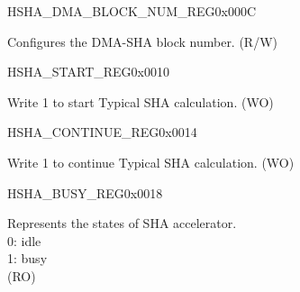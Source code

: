 \begin{register}{H}{SHA\_DMA\_BLOCK\_NUM\_REG}{0x000C}\label{regdesc:SHADMABLOCKNUMREG}
%
%
\regnewline%
\begin{regdesc}\begin{reglist}
\label{fielddesc:SHADMABLOCKNUM}\item [SHA\_DMA\_BLOCK\_NUM] Configures the DMA-SHA block number. (R/W)
\end{reglist}\end{regdesc}
\end{register}

\begin{register}{H}{SHA\_START\_REG}{0x0010}\label{regdesc:SHASTARTREG}
%
%
\regnewline%
\begin{regdesc}\begin{reglist}
\label{fielddesc:SHASTART}\item [SHA\_START] Write 1 to start Typical SHA calculation. (WO)
\end{reglist}\end{regdesc}
\end{register}


\begin{register}{H}{SHA\_CONTINUE\_REG}{0x0014}\label{regdesc:SHACONTINUEREG}
%
%
\regnewline%
\begin{regdesc}\begin{reglist}
\label{fielddesc:SHACONTINUE}\item [SHA\_CONTINUE] Write 1 to continue Typical SHA calculation. (WO)
\end{reglist}\end{regdesc}
\end{register}


\begin{register}{H}{SHA\_BUSY\_REG}{0x0018}\label{regdesc:SHABUSYREG}
%
%
\regnewline%
\begin{regdesc}\begin{reglist}
\label{fielddesc:SHABUSYSTATE}\item [SHA\_BUSY\_STATE] Represents the states of SHA accelerator. \\
0: idle\\
1: busy\\
(RO)
\end{reglist}\end{regdesc}
\end{register}


